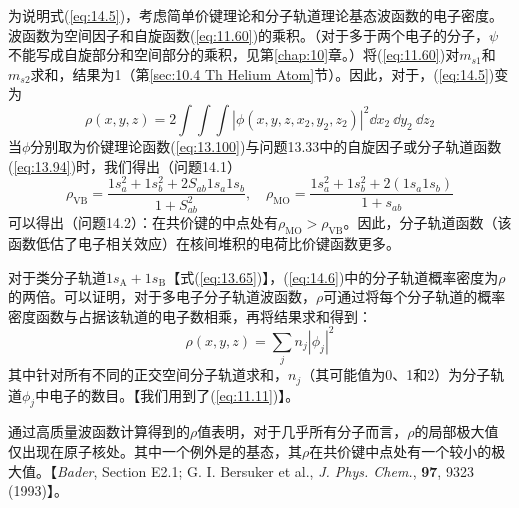     为说明式(\ref{eq:14.5})，考虑简单价键理论和分子轨道理论基态波函数的电子密度。波函数为空间因子和自旋函数(\ref{eq:11.60})的乘积。（对于多于两个电子的分子，$\psi$不能写成自旋部分和空间部分的乘积，见第\ref{chap:10}章。）将(\ref{eq:11.60})对$m_{s1}$和$m_{s2}$求和，结果为1（第\ref{sec:10.4 Th Helium Atom}节）。因此，对于，(\ref{eq:14.5})变为
    \begin{equation*}
        \rho\left(x,y,z\right) = 2\int \int \int \left|\phi\left(x,y,z,x_2,y_2,z_2\right)\right|^2\dd x_2\:\dd y_2\:\dd z_2
    \end{equation*}
    当$\phi$分别取为价键理论函数(\ref{eq:13.100})与问题13.33中的自旋因子或分子轨道函数(\ref{eq:13.94})时，我们得出（问题14.1）
    \begin{equation}
        \rho_{\text{VB}} = \frac{1s_a^2 + 1s_b^2 + 2S_{ab}1s_a1s_b}{1 + S_{ab}^2}, \quad \rho_{\text{MO}} = \frac{1s_a^2 + 1s_b^2 + 2\left(1s_a1s_b\right)}{1 + s_{ab}}
        \label{eq:14.6}
    \end{equation}
    可以得出（问题14.2）：在共价键的中点处有$\rho_{\text{MO}} > \rho_{\text{VB}}$。因此，分子轨道函数（该函数低估了电子相关效应）在核间堆积的电荷比价键函数更多。

    对于类分子轨道$1s_{\text{A}} + 1s_{\text{B}}$【式(\ref{eq:13.65})】，(\ref{eq:14.6})中的分子轨道概率密度为$\rho$的两倍。可以证明，对于多电子分子轨道波函数，$\rho$可通过将每个分子轨道的概率密度函数与占据该轨道的电子数相乘，再将结果求和得到：
    \begin{equation}
        \rho\left(x,y,z\right) = \sum_j n_j \left|\phi_j\right|^2
        \label{eq:14.7}
    \end{equation}
    其中针对所有不同的正交空间分子轨道求和，$n_j$（其可能值为0、1和2）为分子轨道$\phi_j$中电子的数目。【我们用到了(\ref{eq:11.11})】。

    通过高质量波函数计算得到的$\rho$值表明，对于几乎所有分子而言，$\rho$的局部极大值仅出现在原子核处。其中一个例外是的基态，其$\rho$在共价键中点处有一个较小的极大值。【\textit{Bader}, Section E2.1; G. I. Bersuker et al., \textit{J. Phys. Chem.}, \textbf{97}, 9323 (1993)】。

